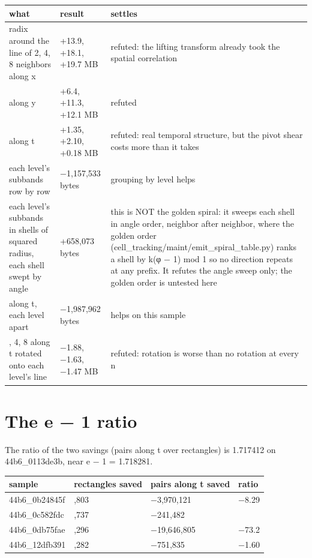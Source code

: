 {\small
\setlength{\tabcolsep}{6pt}
\begin{longtable}{>{\RaggedRight\arraybackslash}p{}>{\RaggedRight\arraybackslash}p{}>{\RaggedRight\arraybackslash}p{}}
\toprule
what & result & settles \\
\midrule
\endhead
radix around the line of 2, 4, 8 neighbors along x & +13.9, +18.1, +19.7 MB & refuted: the lifting transform already took the spatial correlation \\
along y & +6.4, +11.3, +12.1 MB & refuted \\
along t & +1.35, +2.10, +0.18 MB & refuted: real temporal structure, but the pivot shear costs more than it takes \\
each level's subbands row by row & −1,157,533 bytes & grouping by level helps \\
each level's subbands in shells of squared radius, each shell swept by angle & +658,073 bytes & this is NOT the golden spiral: it sweeps each shell in angle order, neighbor after neighbor, where the golden order (cell\_\allowbreak{}tracking/maint/emit\_\allowbreak{}spiral\_\allowbreak{}table.py) ranks a shell by k(φ − 1) mod 1 so no direction repeats at any prefix. It refutes the angle sweep only; the golden order is untested here \\
2 along t, each level apart & −1,987,962 bytes & helps on this sample \\
2, 4, 8 along t rotated onto each level's line & −1.88, −1.63, −1.47 MB & refuted: rotation is worse than no rotation at every n \\
\bottomrule
\end{longtable}
}

\section{\texorpdfstring{The e − 1 ratio}{The e − 1 ratio}}

The ratio of the two savings (pairs along t over rectangles) is 1.717412 on 44b6\_\allowbreak{}0113de3b, near e − 1 = 1.718281.

{\footnotesize
\setlength{\tabcolsep}{6pt}
\begin{longtable}{>{\RaggedRight\arraybackslash}p{}>{\RaggedRight\arraybackslash}p{}>{\RaggedRight\arraybackslash}p{}>{\RaggedRight\arraybackslash}p{}}
\toprule
sample & rectangles saved & pairs along t saved & ratio \\
\midrule
\endhead
44b6\_\allowbreak{}0b24845f & 478,803 & −3,970,121 & −8.29 \\
44b6\_\allowbreak{}0c582fdc & 552,737 & −241,482 & 0.44 \\
44b6\_\allowbreak{}0db75fae & 268,296 & −19,646,805 & −73.2 \\
44b6\_\allowbreak{}12dfb391 & 469,282 & −751,835 & −1.60 \\
\bottomrule
\end{longtable}
}

